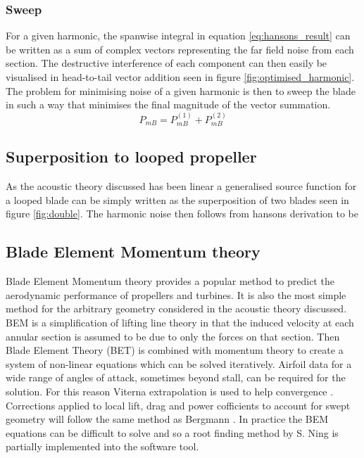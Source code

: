 \documentclass{article}
\begin{document}
\subsubsection{Sweep}
For a given harmonic, the spanwise integral in equation \ref{eq:hansons_result} can be written as a sum of complex vectors representing the far field noise from each section.
The destructive interference of each component can then easily be visualised in head-to-tail vector addition seen in figure \ref{fig:optimised_harmonic}.
The problem for minimising noise of a given harmonic is then to sweep the blade in such a way that minimises the final magnitude of the vector summation.
\begin{equation}
    P_{mB} = P^{(1)}_{mB} + P^{(2)}_{mB}
\end{equation}

\subsection{Superposition to looped propeller}
As the acoustic theory discussed has been linear a generalised source function
for a looped blade can be simply written as the superposition of two blades seen in figure \ref{fig:double}.
The harmonic noise then follows from hansons derivation to be

\subsection{Blade Element Momentum theory}
Blade Element Momentum theory provides a popular method to predict the aerodynamic performance of propellers and turbines.
It is also the most simple method for the arbitrary geometry considered in the acoustic theory discussed.
BEM is a simplification of lifting line theory in that the induced velocity at each annular section is assumed to be due to only the forces on that section.
Then Blade Element Theory (BET) is combined with momentum theory to create a system of non-linear equations which can be solved iteratively.
Airfoil data for a wide range of angles of attack, sometimes beyond stall, can be required for the solution.
For this reason Viterna extrapolation is used to help convergence \cite{MAHMUDDIN2017811}.
Corrections applied to local lift, drag and power cofficients to account for swept geometry will follow the same method as Bergmann \cite{bergmann_sweep}.
In practice the BEM equations can be difficult to solve and so a root finding method by S. Ning \cite{Ning_BEM} is partially implemented into the software tool.
\end{document}
